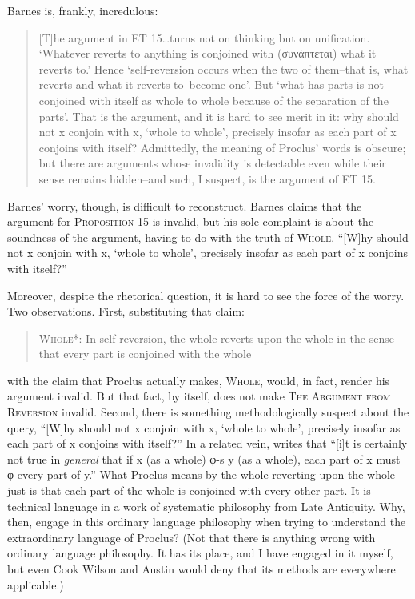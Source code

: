 Barnes is, frankly, incredulous:
\begin{quote}
	[T]he argument in ET 15\ldots turns not on thinking but on unification. `Whatever reverts to anything is conjoined with ({\sbl συνάπτεται}) what it reverts to.' Hence `self-reversion occurs when the two of them–that is, what reverts and what it reverts to–become one'. But `what has parts is not conjoined with itself as whole to whole because of the separation of the parts'. That is the argument, and it is hard to see merit in it: why should not x conjoin with x, `whole to whole', precisely insofar as each part of x conjoins with itself? Admittedly, the meaning of Proclus' words is obscure; but there are arguments whose invalidity is detectable even while their sense remains hidden–and such, I suspect, is the argument of ET 15. \citep[521–2]{Barnes:2011kv}
\end{quote}
Barnes' worry, though, is difficult to reconstruct. Barnes claims that the argument for \textsc{Proposition} 15 is invalid, but his sole complaint is about the soundness of the argument, having to do with the truth of \textsc{Whole}. ``[W]hy should not x conjoin with x, `whole to whole', precisely insofar as each part of x conjoins with itself?'' 

Moreover, despite the rhetorical question, it is hard to see the force of the worry. Two observations. First, substituting that claim:
\begin{quote}
	\textsc{Whole*}: In self-reversion, the whole reverts upon the whole in the sense that every part is conjoined with the whole
\end{quote}
with the claim that Proclus actually makes, \textsc{Whole}, would, in fact, render his argument invalid. But that fact, by itself, does not make \textsc{The Argument from Reversion} invalid. Second, there is something methodologically suspect about the query, ``[W]hy should not x conjoin with x, `whole to whole', precisely insofar as each part of x conjoins with itself?'' In a related vein, \citet[129–30]{Coope:2020aa} writes that ``[i]t is certainly not true in \emph{general} that if x (as a whole) {\sbl φ}-s y (as a whole), each part of x must {\sbl φ} every part of y.'' What Proclus means by the whole reverting upon the whole just is that each part of the whole is conjoined with every other part. It is technical language in a work of systematic philosophy from Late Antiquity. Why, then, engage in this ordinary language philosophy when trying to understand the extraordinary language of Proclus? (Not that there is anything wrong with ordinary language philosophy. It has its place, and I have engaged in it myself, but even Cook Wilson and Austin would deny that its methods are everywhere applicable.)


